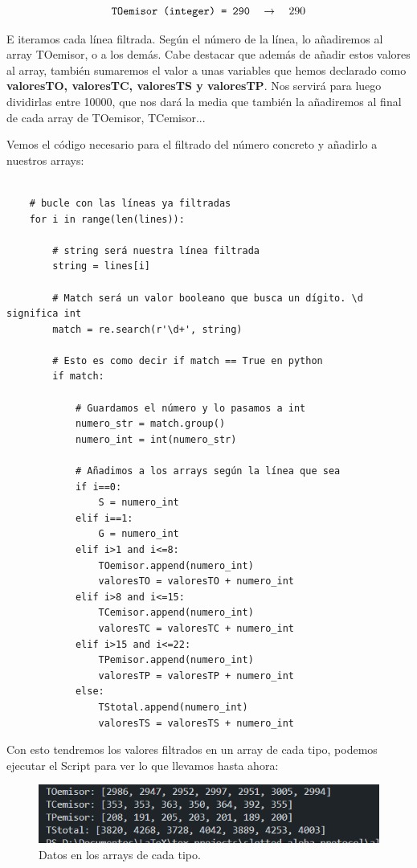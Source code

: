 \documentclass{article}
\begin{document}
$$\verb|TOemisor (integer) = 290| \quad \rightarrow \quad 290$$

E iteramos cada línea filtrada. Según el número de la línea, lo añadiremos al array TOemisor, o a los demás. Cabe destacar que además de añadir estos valores al array, también sumaremos el valor a unas variables que hemos declarado como \textbf{valoresTO, valoresTC, valoresTS y valoresTP}. Nos servirá para luego dividirlas entre 10000, que nos dará la media que también la añadiremos al final de cada array de TOemisor, TCemisor... 

Vemos el código necesario para el filtrado del número concreto y añadirlo a nuestros arrays:

\quad 

\begin{center} 
    \begin{verbatim}

    # bucle con las líneas ya filtradas
    for i in range(len(lines)):

        # string será nuestra línea filtrada
        string = lines[i]

        # Match será un valor booleano que busca un dígito. \d significa int
        match = re.search(r'\d+', string)

        # Esto es como decir if match == True en python
        if match:

            # Guardamos el número y lo pasamos a int
            numero_str = match.group()
            numero_int = int(numero_str)

            # Añadimos a los arrays según la línea que sea
            if i==0:
                S = numero_int
            elif i==1:
                G = numero_int
            elif i>1 and i<=8:
                TOemisor.append(numero_int)
                valoresTO = valoresTO + numero_int
            elif i>8 and i<=15:
                TCemisor.append(numero_int)
                valoresTC = valoresTC + numero_int
            elif i>15 and i<=22:
                TPemisor.append(numero_int)
                valoresTP = valoresTP + numero_int
            else:
                TStotal.append(numero_int)
                valoresTS = valoresTS + numero_int
    \end{verbatim}
    \end{center} 
\quad

Con esto tendremos los valores filtrados en un array de cada tipo, podemos ejecutar el Script para ver lo que llevamos hasta ahora:

\begin{figure}[h]
    \centering
    \includegraphics[width=0.7\linewidth]{src/lineas filtradas2.png}
    \caption{\label{fig:filtradas2} Datos en los arrays de cada tipo.}
\end{figure}
\end{document}
